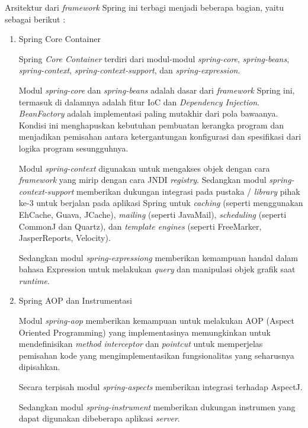 \documentclass[pdftex,12pt, oneside]{article}
\begin{document}
\begin{enumerate}
\begin{enumerate}
  Arsitektur dari \textit{framework} Spring ini terbagi menjadi beberapa bagian, yaitu sebagai berikut :
  
  \begin{enumerate}[1)]
    \item Spring Core Container
    
    Spring \textit{Core Container} terdiri dari modul-modul \textit{spring-core}, \textit{spring-beans}, \textit{spring-context}, \textit{spring-context-support}, dan \textit{spring-expression}.
    
    Modul \textit{spring-core} dan \textit{spring-beans} adalah dasar dari \textit{framework} Spring ini, termasuk di dalamnya adalah fitur IoC dan \textit{Dependency Injection}. \textit{BeanFactory} adalah implementasi paling mutakhir dari pola bawaanya. Kondisi ini menghapuskan kebutuhan pembuatan kerangka program dan menjadikan pemisahan antara ketergantungan konfigurasi dan spesifikasi dari logika program sesungguhnya.
    
    Modul \textit{spring-context} digunakan untuk mengakses objek dengan cara \textit{framework} yang mirip dengan cara JNDI \textit{registry}. Sedangkan modul \textit{spring-context-support} memberikan dukungan integrasi pada pustaka / \textit{library} pihak ke-3 untuk berjalan pada aplikasi Spring untuk \textit{caching} (seperti menggunakan EhCache, Guava, JCache), \textit{mailing} (seperti JavaMail), \textit{scheduling} (seperti CommonJ dan Quartz), dan \textit{template engines} (seperti FreeMarker, JasperReports, Velocity).
    
    Sedangkan modul \textit{spring-expressiong} memberikan kemampuan handal dalam bahasa Expression untuk melakukan \textit{query} dan manipulasi objek grafik saat \textit{runtime}.
    
    \item Spring AOP dan Instrumentasi
    
    Modul \textit{spring-aop} memberikan kemampuan untuk melakukan AOP (Aspect Oriented Programming) yang implementasinya memungkinkan untuk mendefinisikan \textit{method interceptor} dan \textit{pointcut} untuk memperjelas pemisahan kode yang mengimplementasikan fungsionalitas yang seharusnya dipisahkan.
    
    Secara terpisah modul \textit{spring-aspects} memberikan integrasi terhadap AspectJ.
    
    Sedangkan modul \textit{spring-instrument} memberikan dukungan instrumen yang dapat digunakan dibeberapa aplikasi \textit{server}.
    


\end{enumerate}
\end{enumerate}
\end{enumerate}
\end{document}
